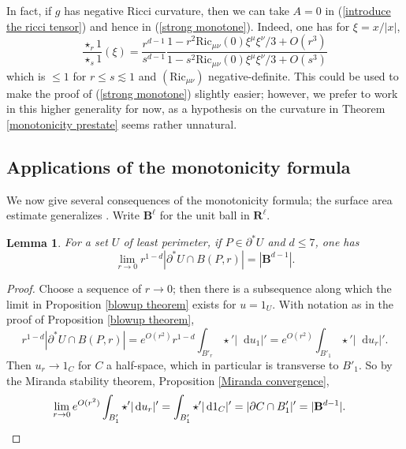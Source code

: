 \documentclass[reqno,10pt]{amsart}
\newcommand{\RR}{\mathbf{R}}
\newcommand{\Ball}{\mathbf{B}}
\newcommand{\Ric}{\mathrm{Ric}}
\newcommand*\dif{\mathop{}\!\mathrm{d}}
\newtheorem{lemma}[theorem]{Lemma}
\theoremstyle{definition}
\numberwithin{equation}{section}
\begin{document}
In fact, if $g$ has negative Ricci curvature, then we can take $A = 0$ in (\ref{introduce the ricci tensor}) and hence in (\ref{strong monotone}). Indeed, one has for $\xi = x/|x|$,
$$\frac{\star_r 1}{\star_s 1}(\xi) = \frac{r^{d - 1}}{s^{d - 1}} \frac{1 - r^2 \Ric_{\mu \nu}(0) \xi^\mu \xi^\nu/3 + O(r^3)}{1 - s^2 \Ric_{\mu \nu}(0) \xi^\mu \xi^\nu/3 + O(s^3)}$$
which is $\leq 1$ for $r \leq s \lesssim 1$ and $(\Ric_{\mu\nu})$ negative-definite.
This could be used to make the proof of (\ref{strong monotone}) slightly easier; however, we prefer to work in this higher generality for now, as a hypothesis on the curvature in Theorem \ref{monotonicity prestate} seems rather unnatural.

\subsection{Applications of the monotonicity formula}
We now give several consequences of the monotonicity formula; the surface area estimate generalizes \cite[Remark 5.13]{Giusti77}.
Write $\Ball^\ell$ for the unit ball in $\RR^\ell$.

\begin{lemma}\label{least perimeter minimal size}
For a set $U$ of least perimeter, if $P \in \partial^* U$ and $d \leq 7$, one has
$$\lim_{r \to 0} r^{1 - d} |\partial^* U \cap B(P, r)| = |\Ball^{d - 1}|.$$
\end{lemma}
\begin{proof}
Choose a sequence of $r \to 0$; then there is a subsequence along which the limit in Proposition \ref{blowup theorem} exists for $u = 1_U$.
With notation as in the proof of Proposition \ref{blowup theorem},
$$r^{1 - d} |\partial^* U \cap B(P, r)| = e^{O(r^2)} r^{1 - d}\int_{B'_r} \star'|\dif u_1|' = e^{O(r^2)} \int_{B'_1} \star'|\dif u_r|'.$$
Then $u_r \to 1_C$ for $C$ a half-space, which in particular is transverse to $B'_1$.
So by the Miranda stability theorem, Proposition \ref{Miranda convergence},
\begin{align*}
\lim_{r \to 0} e^{O(r^2)} \int_{B'_1} \star'|\dif u_r|' &= \int_{B'_1} \star'|\dif 1_C|' = |\partial C \cap B'_1|' = |\Ball^{d - 1}|. \qedhere
\end{align*}
\end{proof}
\end{document}
